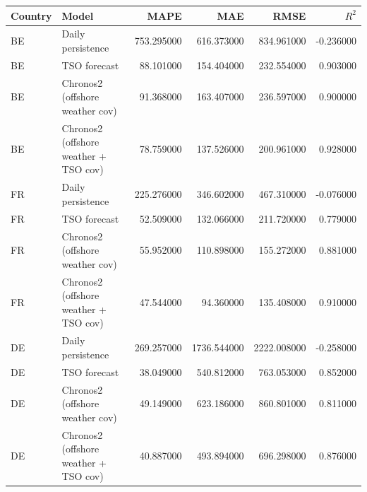 \begin{tabular}{llrrrr}
\toprule
Country & Model & MAPE & MAE & RMSE & $R^2$ \\
\midrule
BE & Daily persistence & 753.295000 & 616.373000 & 834.961000 & -0.236000 \\
BE & TSO forecast & 88.101000 & 154.404000 & 232.554000 & 0.903000 \\
BE & Chronos2 (offshore weather cov) & 91.368000 & 163.407000 & 236.597000 & 0.900000 \\
BE & Chronos2 (offshore weather + TSO cov) & 78.759000 & 137.526000 & 200.961000 & 0.928000 \\
FR & Daily persistence & 225.276000 & 346.602000 & 467.310000 & -0.076000 \\
FR & TSO forecast & 52.509000 & 132.066000 & 211.720000 & 0.779000 \\
FR & Chronos2 (offshore weather cov) & 55.952000 & 110.898000 & 155.272000 & 0.881000 \\
FR & Chronos2 (offshore weather + TSO cov) & 47.544000 & 94.360000 & 135.408000 & 0.910000 \\
DE & Daily persistence & 269.257000 & 1736.544000 & 2222.008000 & -0.258000 \\
DE & TSO forecast & 38.049000 & 540.812000 & 763.053000 & 0.852000 \\
DE & Chronos2 (offshore weather cov) & 49.149000 & 623.186000 & 860.801000 & 0.811000 \\
DE & Chronos2 (offshore weather + TSO cov) & 40.887000 & 493.894000 & 696.298000 & 0.876000 \\
\bottomrule
\end{tabular}
